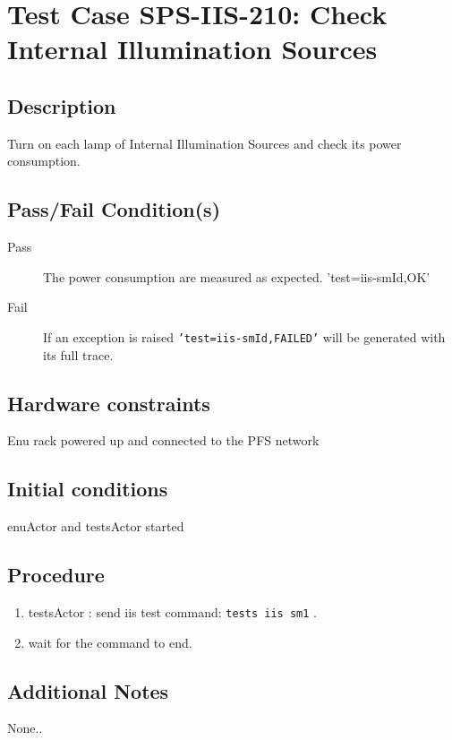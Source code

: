 \section{Test Case SPS-IIS-210: Check Internal Illumination Sources}

\subsection{Description}

Turn on each lamp of Internal Illumination Sources and check its power consumption.
\subsection{Pass/Fail Condition(s)}

\begin{description}
\item [Pass] The power consumption are measured as expected. {'test=iis-smId,OK'}
\item [Fail] If an exception is raised \texttt{'test=iis-smId,FAILED'} will be generated with its full trace.
\end{description}

\subsection{Hardware constraints}

Enu rack powered up and connected to the PFS network

\subsection{Initial conditions}
enuActor and testsActor started

\subsection{Procedure}

\begin{enumerate}
    \item testsActor : send iis test command: \texttt{tests iis sm1} .
    \item wait for the command to end.
\end{enumerate}



\subsection{Additional Notes}

None..